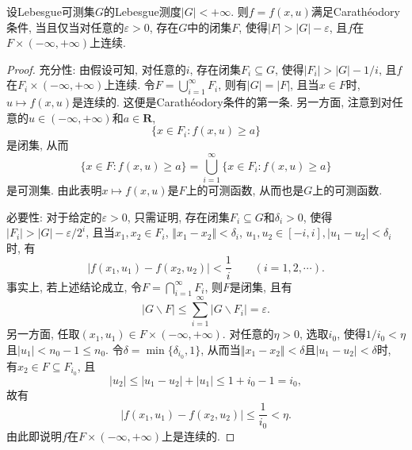\begin{lemma}\label{lma1.3}
    设Lebesgue可测集$G$的Lebesgue测度$|G| < +\infty$. 则$f = f(x, u)$满足Carath\'eodory条件, 当且仅当对任意的$\varepsilon > 0$, 存在$G$中的闭集$F$, 使得$|F| > |G| - \varepsilon$, 且$f$在$F \times (-\infty, +\infty)$上连续.
    \begin{proof}
        充分性: 由假设可知, 对任意的$i$, 存在闭集$F_i \subseteq G$, 使得$|F_i| > |G| - 1/i$, 且$f$在$F_i \times (-\infty, +\infty)$上连续. 令$F = \bigcup_{i = 1}^{\infty}F_i$, 则有$|G| = |F|$, 且当$x \in F$时, $u \mapsto f(x, u)$是连续的. 这便是Carath\'eodory条件的第一条. 另一方面, 注意到对任意的$u \in (-\infty, +\infty)$和$a \in \mathbf{R}$,  
        \begin{equation*}
            \{x \in F_i\colon f(x, u) \geq a\}
        \end{equation*}
        是闭集, 从而 
        \begin{equation*}
            \{x \in F\colon f(x, u) \geq a\} = \bigcup_{i = 1}^{\infty}\{x \in F_i\colon f(x, u) \geq a\}
        \end{equation*}
        是可测集. 由此表明$x \mapsto f(x, u)$是$F$上的可测函数, 从而也是$G$上的可测函数.

        必要性: 对于给定的$\varepsilon > 0$, 只需证明, 存在闭集$F_i \subseteq G$和$\delta_i > 0$, 使得$|F_i| > |G| - \varepsilon/2^i$,
        且当$x_1, x_2 \in F_i$, $\Vert x_1 - x_2\Vert < \delta_i$, $u_1, u_2 \in [-i, i], |u_1 - u_2| < \delta_i$时, 有 
        \begin{equation*}
            |f(x_1, u_1) - f(x_2, u_2)| < \frac{1}{i} \qquad (i = 1, 2, \cdots).
        \end{equation*}
        事实上, 若上述结论成立, 令$F = \bigcap_{i = 1}^{\infty}F_i$, 则$F$是闭集, 且有 
        \begin{equation*}
            |G \smallsetminus F| \leq \sum_{i = 1}^{\infty}|G \smallsetminus F_i| = \varepsilon.
        \end{equation*}
        另一方面, 任取$(x_1, u_1) \in F \times (-\infty, +\infty)$. 对任意的$\eta > 0$, 选取$i_0$, 使得$1/i_0 < \eta$且$|u_1| < n_0 - 1 \leq n_0$. 令$\delta = \min\{\delta_{i_0}, 1\}$, 从而当$\Vert x_1 - x_2\Vert < \delta$且$|u_1 - u_2| < \delta$时, 有$x_2 \in F \subseteq F_{i_0}$, 且 
        \begin{equation*}
            |u_2| \leq |u_1 - u_2| + |u_1| \leq 1 + i_0 - 1 = i_0,
        \end{equation*}
        故有 
        \begin{equation*}
            |f(x_1, u_1) - f(x_2, u_2)| \leq \frac{1}{i_0} < \eta.
        \end{equation*}
        由此即说明$f$在$F \times (-\infty, +\infty)$上是连续的.


\end{proof}
\end{lemma}
